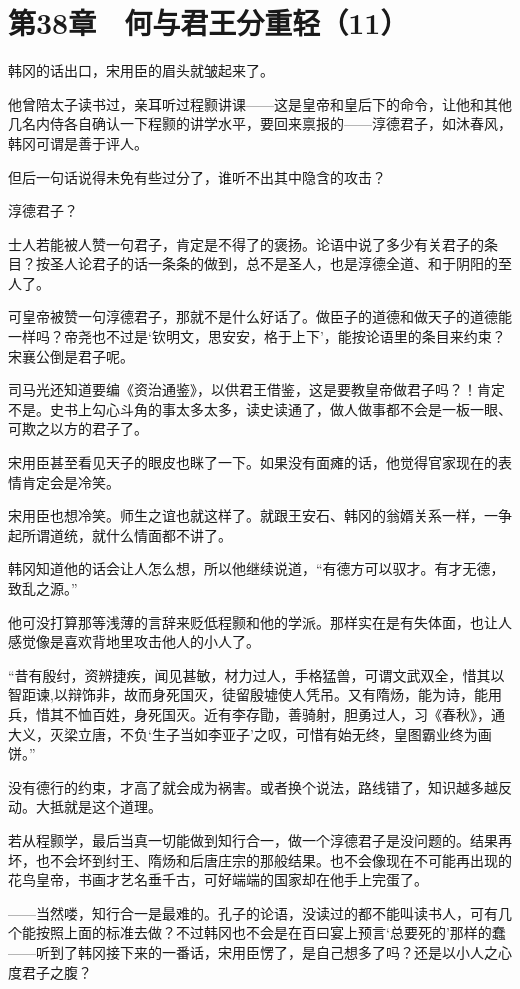 \section{第38章　何与君王分重轻（11）}

韩冈的话出口，宋用臣的眉头就皱起来了。

他曾陪太子读书过，亲耳听过程颢讲课——这是皇帝和皇后下的命令，让他和其他几名内侍各自确认一下程颢的讲学水平，要回来禀报的——淳德君子，如沐春风，韩冈可谓是善于评人。

但后一句话说得未免有些过分了，谁听不出其中隐含的攻击？

淳德君子？

士人若能被人赞一句君子，肯定是不得了的褒扬。论语中说了多少有关君子的条目？按圣人论君子的话一条条的做到，总不是圣人，也是淳德全道、和于阴阳的至人了。

可皇帝被赞一句淳德君子，那就不是什么好话了。做臣子的道德和做天子的道德能一样吗？帝尧也不过是‘钦明文，思安安，格于上下’，能按论语里的条目来约束？宋襄公倒是君子呢。

司马光还知道要编《资治通鉴》，以供君王借鉴，这是要教皇帝做君子吗？！肯定不是。史书上勾心斗角的事太多太多，读史读通了，做人做事都不会是一板一眼、可欺之以方的君子了。

宋用臣甚至看见天子的眼皮也眯了一下。如果没有面瘫的话，他觉得官家现在的表情肯定会是冷笑。

宋用臣也想冷笑。师生之谊也就这样了。就跟王安石、韩冈的翁婿关系一样，一争起所谓道统，就什么情面都不讲了。

韩冈知道他的话会让人怎么想，所以他继续说道，“有德方可以驭才。有才无德，致乱之源。”

他可没打算那等浅薄的言辞来贬低程颢和他的学派。那样实在是有失体面，也让人感觉像是喜欢背地里攻击他人的小人了。

“昔有殷纣，资辨捷疾，闻见甚敏，材力过人，手格猛兽，可谓文武双全，惜其以智距谏,以辩饰非，故而身死国灭，徒留殷墟使人凭吊。又有隋炀，能为诗，能用兵，惜其不恤百姓，身死国灭。近有李存勖，善骑射，胆勇过人，习《春秋》，通大义，灭梁立唐，不负‘生子当如李亚子’之叹，可惜有始无终，皇图霸业终为画饼。”

没有德行的约束，才高了就会成为祸害。或者换个说法，路线错了，知识越多越反动。大抵就是这个道理。

若从程颢学，最后当真一切能做到知行合一，做一个淳德君子是没问题的。结果再坏，也不会坏到纣王、隋炀和后唐庄宗的那般结果。也不会像现在不可能再出现的花鸟皇帝，书画才艺名垂千古，可好端端的国家却在他手上完蛋了。

——当然喽，知行合一是最难的。孔子的论语，没读过的都不能叫读书人，可有几个能按照上面的标准去做？不过韩冈也不会是在百曰宴上预言‘总要死的’那样的蠢——听到了韩冈接下来的一番话，宋用臣愣了，是自己想多了吗？还是以小人之心度君子之腹？


